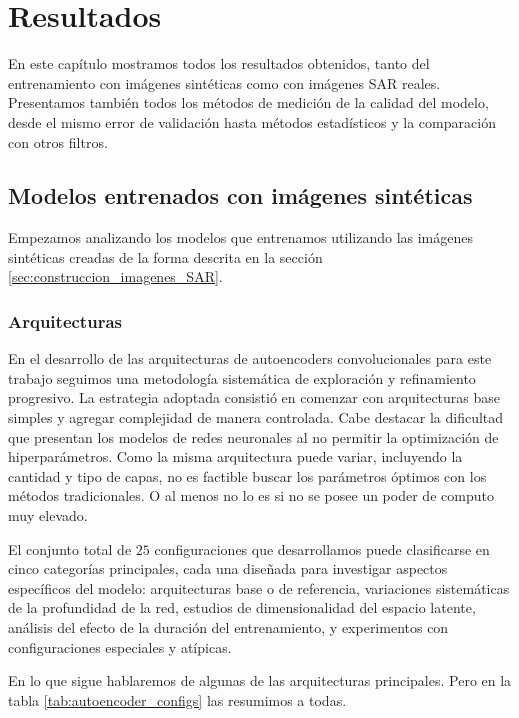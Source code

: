 \chapter{Resultados}
\label{resultados}

En este capítulo mostramos todos los resultados obtenidos, tanto del entrenamiento con imágenes sintéticas como con imágenes SAR reales. Presentamos también todos los métodos de medición de la calidad del modelo, desde el mismo error de validación hasta métodos estadísticos y la comparación con otros filtros.

\section{Modelos entrenados con imágenes sintéticas}

Empezamos analizando los modelos que entrenamos utilizando las imágenes sintéticas creadas de la forma descrita en la sección \ref{sec:construccion_imagenes_SAR}.

\subsection{Arquitecturas}


En el desarrollo de las arquitecturas de autoencoders convolucionales para este trabajo seguimos una metodología sistemática de exploración y refinamiento progresivo. La estrategia adoptada consistió en comenzar con arquitecturas base simples y agregar complejidad de manera controlada. Cabe destacar la dificultad que presentan los modelos de redes neuronales al no permitir la optimización de hiperparámetros. Como la misma arquitectura puede variar, incluyendo la cantidad y tipo de capas, no es factible buscar los parámetros óptimos con los métodos tradicionales. O al menos no lo es si no se posee un poder de computo muy elevado.

El conjunto total de $25$ configuraciones que desarrollamos puede clasificarse en cinco categorías principales, cada una diseñada para investigar aspectos específicos del modelo: arquitecturas base o de referencia, variaciones sistemáticas de la profundidad de la red, estudios de dimensionalidad del espacio latente, análisis del efecto de la duración del entrenamiento, y experimentos con configuraciones especiales y atípicas.

En lo que sigue hablaremos de algunas de las arquitecturas principales. Pero en la tabla \ref{tab:autoencoder_configs} las resumimos a todas.

